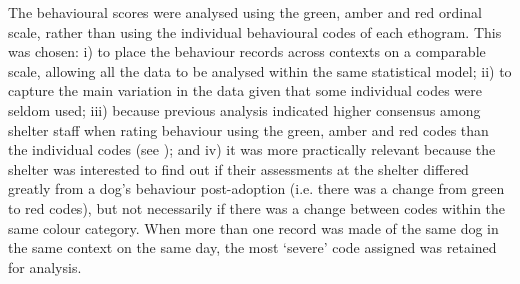 \documentclass[fleqn,10pt]{wlscirep}
\begin{document}
The behavioural scores were analysed using the green, amber and red ordinal scale, rather than using the individual behavioural codes of each ethogram. This was chosen: i) to place the behaviour records across contexts on a comparable scale, allowing all the data to be analysed within the same statistical model; ii) to capture the main variation in the data given that some individual codes were seldom used; iii) because previous analysis indicated higher consensus among shelter staff when rating behaviour using the green, amber and red codes than the individual codes (see \cite{goold2017modelling}); and iv) it was more practically relevant because the shelter was interested to find out if their assessments at the shelter differed greatly from a dog's behaviour post-adoption (i.e. there was a change from green to red codes), but not necessarily if there was a change between codes within the same colour category. When more than one record was made of the same dog in the same context on the same day, the most `severe' code assigned was retained for analysis.
\end{document}
